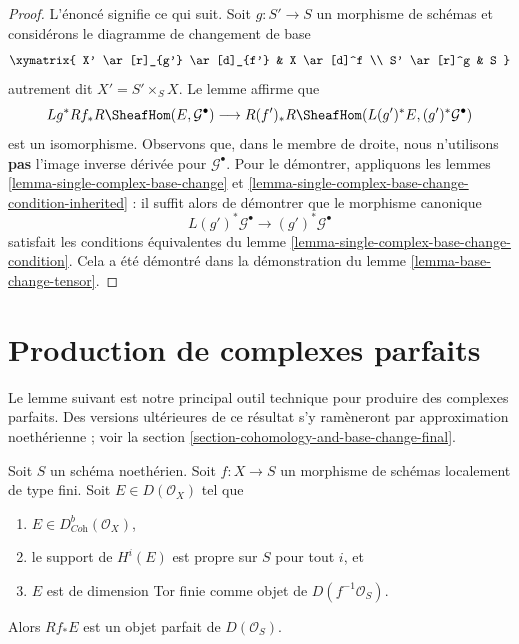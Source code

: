\begin{proof}
L'énoncé signifie ce qui suit. Soit $g : S' \to S$ un morphisme de
schémas et considérons le diagramme de changement de base
$$
\xymatrix{
X' \ar[r]_{g'} \ar[d]_{f'} &
X \ar[d]^f \\
S' \ar[r]^g &
S
}
$$
autrement dit $X' = S' \times_S X$. Le lemme affirme que
$$
Lg^*Rf_*R\SheafHom(E, \mathcal{G}^\bullet)
\longrightarrow
R(f')_*R\SheafHom(L(g')^*E, (g')^*\mathcal{G}^\bullet)
$$
est un isomorphisme. Observons que, dans le membre de droite, nous n'utilisons
{\bf pas} l'image inverse dérivée pour $\mathcal{G}^\bullet$. Pour le démontrer, appliquons
les lemmes \ref{lemma-single-complex-base-change} et
\ref{lemma-single-complex-base-change-condition-inherited} : il suffit alors de démontrer que le morphisme canonique
$$
L(g')^*\mathcal{G}^\bullet \to (g')^*\mathcal{G}^\bullet
$$
satisfait les conditions équivalentes du
lemme \ref{lemma-single-complex-base-change-condition}.
Cela a été démontré dans la démonstration du lemme \ref{lemma-base-change-tensor}.
\end{proof}




\section{Production de complexes parfaits}
\label{section-producing-perfect}

\noindent
Le lemme suivant est notre principal outil technique pour produire des
complexes parfaits. Des versions ultérieures de ce résultat s'y ramèneront
par approximation noethérienne ; voir la
section \ref{section-cohomology-and-base-change-final}.

\begin{lemma}
\label{lemma-perfect-direct-image}
Soit $S$ un schéma noethérien. Soit $f : X \to S$ un morphisme de schémas
localement de type fini. Soit $E \in D(\mathcal{O}_X)$ tel que
\begin{enumerate}
\item $E \in D^b_{\textit{Coh}}(\mathcal{O}_X)$,
\item le support de $H^i(E)$ est propre sur $S$ pour tout $i$, et
\item $E$ est de dimension Tor finie comme objet de $D(f^{-1}\mathcal{O}_S)$.
\end{enumerate}
Alors $Rf_*E$ est un objet parfait de $D(\mathcal{O}_S)$.
\end{lemma}

